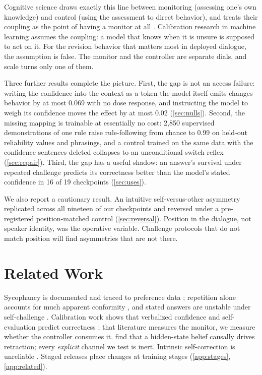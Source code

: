 \documentclass{article}
\begin{document}
Cognitive science draws exactly this line between monitoring (assessing one's own knowledge) and control (using the assessment to direct behavior), and treats their coupling as the point of having a monitor at all \citep{nelson1990metamemory}. Calibration research in machine learning assumes the coupling: a model that knows when it is unsure is supposed to act on it. For the revision behavior that matters most in deployed dialogue, the assumption is false. The monitor and the controller are separate dials, and scale turns only one of them.

Three further results complete the picture. First, the gap is not an access failure: writing the confidence into the context as a token the model itself emits changes behavior by at most 0.069 with no dose response, and instructing the model to weigh its confidence moves the effect by at most 0.02 (\cref{sec:nulls}). Second, the missing mapping is trainable at essentially no cost: 2{,}850 supervised demonstrations of one rule raise rule-following from chance to 0.99 on held-out reliability values and phrasings, and a control trained on the same data with the confidence sentences deleted collapses to an unconditional switch reflex (\cref{sec:repair}). Third, the gap has a useful shadow: an answer's survival under repeated challenge predicts its correctness better than the model's stated confidence in 16 of 19 checkpoints (\cref{sec:uses}).

We also report a cautionary result. An intuitive self-versus-other asymmetry replicated across all nineteen of our checkpoints and reversed under a pre-registered position-matched control (\cref{sec:reversal}). Position in the dialogue, not speaker identity, was the operative variable. Challenge protocols that do not match position will find asymmetries that are not there.

\section{Related Work}
\label{sec:related}
Sycophancy is documented and traced to preference data \citep{sharma2024sycophancy, perez2023discovering}; repetition alone accounts for much apparent conformity \citep{hu2026conformity}, and stated answers are unstable under self-challenge \citep{saadat2026certainty}. Calibration work shows that verbalized confidence and self-evaluation predict correctness \citep{lin2022teaching, tian2023just, xiong2024can, kadavath2022language}; that literature measures the monitor, we measure whether the controller consumes it. \citet{yang2025retraction} find that a hidden-state belief causally drives retraction; every \emph{explicit} channel we test is inert. Intrinsic self-correction is unreliable \citep{huang2024large}. Staged releases \citep{olmo2025, lambert2024tulu, tunstall2024zephyr} place changes at training stages (\cref{app:stages}, \cref{app:related}).
\end{document}
